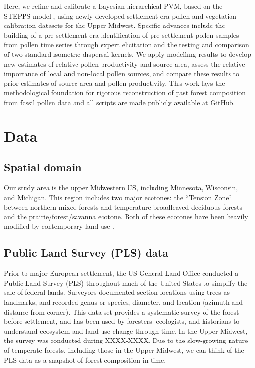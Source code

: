 \documentclass[12pt]{article}
\begin{document}
Here, we refine and calibrate a Bayesian hierarchical PVM, based on
the STEPPS model \citep{paciorek2009mapping}, using newly developed
settlement-era pollen and vegetation calibration datasets for the
Upper Midwest.  Specific advances include the building of a
pre-settlement era identification of pre-settlement pollen samples
from pollen time series through expert elicitation and the testing and
comparison of two standard isometric dispersal kernels.  We apply
modelling results to develop new estimates of relative pollen
productivity and source area, assess the relative importance of local
and non-local pollen sources, and compare these results to prior
estimates of source area and pollen productivity.  This work lays the
methodological foundation for rigorous reconstruction of past forest
composition from fossil pollen data and all scripts are made publicly
available at GitHub.

\section{Data}

\subsection{Spatial domain}

Our study area is the upper Midwestern US, including Minnesota,
Wisconsin, and Michigan.  This region includes two major ecotones: the
``Tension Zone'' between northern mixed forests and temperature
broadleaved deciduous forests and the prairie/forest/savanna ecotone.
Both of these ecotones have been heavily modified by contemporary land
use \citep{goring2015b}.


\subsection{Public Land Survey (PLS) data}

Prior to major European settlement, the US General Land Office
conducted a Public Land Survey (PLS) throughout much of the United
States to simplify the sale of federal lands. Surveyors
documented section locations using trees as landmarks, and recorded
genus or species, diameter, and location (azimuth and distance from
corner). This data set provides a systematic survey of the forest
before settlement, and has been used by foresters, ecologists, and
historians to understand ecosystem and land-use change through
time. In the Upper Midwest, the survey was conducted during
XXXX-XXXX. Due to the slow-growing nature of temperate forests,
including those in the Upper Midwest, we can think of the PLS data as
a snapshot of forest composition in time. 
\end{document}
